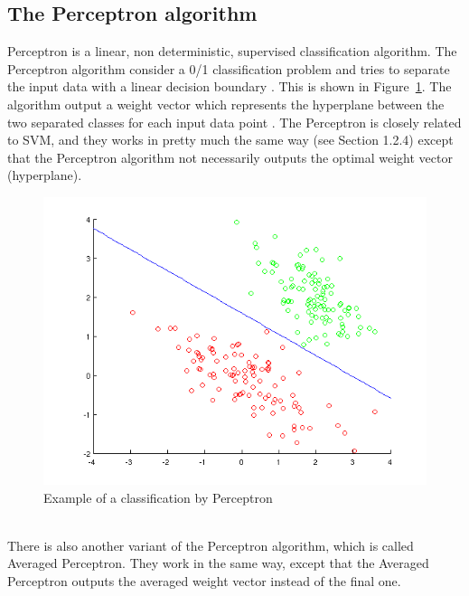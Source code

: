 \subsection{The Perceptron algorithm}
Perceptron is a linear, non deterministic, supervised classification algorithm. The Perceptron algorithm consider a 0/1 classification problem
and tries to separate the input data with a linear decision boundary \citep{perceptron_ai, perceptron_url}. This is shown in Figure~\ref{fig:perceptron}. The algorithm output a weight vector which represents the hyperplane between the two separated classes for each input data point \citep{perceptron_url}. The Perceptron is closely related to SVM, and they works in pretty much the same way (see Section 1.2.4) except that the Perceptron algorithm not necessarily outputs the optimal weight vector (hyperplane).
\begin{figure}[h!]
\centering
\includegraphics[scale = 0.4]{../Plottar/perceptron_example.png}
\caption{Example of a classification by Perceptron}
\label{fig:perceptron}
\end{figure}\\
There is also another variant of the Perceptron algorithm, which is called Averaged Perceptron. They work in the same way, except that the Averaged Perceptron outputs the averaged weight vector instead of the final one.

